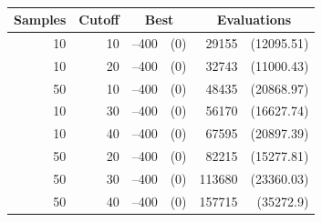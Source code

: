 
\begin{table}[tbp]
\centering
\caption{}
\begin{tabular}{|r|r|rr|rr|}
\hline
\multicolumn{1}{|c|}{Samples} & \multicolumn{1}{c|}{Cutoff} &
 \multicolumn{2}{c|}{Best} & 
 \multicolumn{2}{c|}{Evaluations}  \\ \hline
10 & 10 & --400 &  (0) & 29155 &  (12095.51) \\ \hline
10 & 20 & --400 &  (0) & 32743 &  (11000.43) \\ \hline
50 & 10 & --400 &  (0) & 48435 &  (20868.97) \\ \hline
10 & 30 & --400 &  (0) & 56170 &  (16627.74) \\ \hline
10 & 40 & --400 &  (0) & 67595 &  (20897.39) \\ \hline
50 & 20 & --400 &  (0) & 82215 &  (15277.81) \\ \hline
50 & 30 & --400 &  (0) & 113680 &  (23360.03) \\ \hline
50 & 40 & --400 &  (0) & 157715 &  (35272.9) \\ \hline
\end{tabular}
\label{his-onemax}
\end{table}


